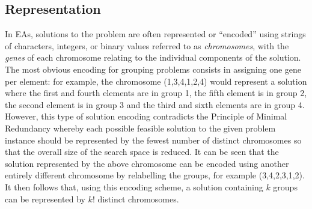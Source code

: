 \documentclass[a4paper,11pt,authoryear]{elsarticle}
\begin{document}

\subsection{Representation}
\label{sub:representation}

\noindent In EAs, solutions to the problem are often represented or ``encoded'' using strings of characters, integers, or binary values referred to as \emph{chromosomes}, with the \emph{genes} of each chromosome relating to the individual components of the solution. The most obvious encoding for grouping problems consists in assigning one gene per element: for example, the chromosome (1,3,4,1,2,4) would represent a solution where the first and fourth elements are in group 1, the fifth element is in group 2, the second element is in group 3 and the third and sixth elements are in group 4. However, this type of solution encoding contradicts the Principle of Minimal Redundancy \citep{radcliffe1991} whereby each possible feasible solution to the given problem instance should be represented by the fewest number of distinct chromosomes so that the overall size of the search space is reduced. It can be seen that the solution represented by the above chromosome can be encoded using another entirely different chromosome by relabelling the groups, for example (3,4,2,3,1,2). It then follows that, using this encoding scheme, a solution containing $k$ groups can be represented by $k!$ distinct chromosomes.
\end{document}
